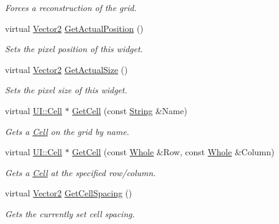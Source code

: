 \begin{DoxyCompactItemize}
\begin{DoxyCompactList}\small\item\em Forces a reconstruction of the grid. \item\end{DoxyCompactList}\item 
virtual \hyperlink{classphys_1_1Vector2}{Vector2} \hyperlink{classphys_1_1UI_1_1CellGrid_a1ead8b427b5989ec137aa0ca8e017f73}{GetActualPosition} ()
\begin{DoxyCompactList}\small\item\em Sets the pixel position of this widget. \item\end{DoxyCompactList}\item 
virtual \hyperlink{classphys_1_1Vector2}{Vector2} \hyperlink{classphys_1_1UI_1_1CellGrid_ad0ea7915446ba7821212e6a43aede7e1}{GetActualSize} ()
\begin{DoxyCompactList}\small\item\em Sets the pixel size of this widget. \item\end{DoxyCompactList}\item 
virtual \hyperlink{classphys_1_1UI_1_1Cell}{UI::Cell} $\ast$ \hyperlink{classphys_1_1UI_1_1CellGrid_a563d2fcfdb017579633727094a3176f3}{GetCell} (const \hyperlink{namespacephys_aa03900411993de7fbfec4789bc1d392e}{String} \&Name)
\begin{DoxyCompactList}\small\item\em Gets a \hyperlink{classphys_1_1UI_1_1Cell}{Cell} on the grid by name. \item\end{DoxyCompactList}\item 
virtual \hyperlink{classphys_1_1UI_1_1Cell}{UI::Cell} $\ast$ \hyperlink{classphys_1_1UI_1_1CellGrid_a6a39785b673abb8cffc8bbd0b8837208}{GetCell} (const \hyperlink{namespacephys_a460f6bc24c8dd347b05e0366ae34f34a}{Whole} \&Row, const \hyperlink{namespacephys_a460f6bc24c8dd347b05e0366ae34f34a}{Whole} \&Column)
\begin{DoxyCompactList}\small\item\em Gets a \hyperlink{classphys_1_1UI_1_1Cell}{Cell} at the specified row/column. \item\end{DoxyCompactList}\item 
virtual \hyperlink{classphys_1_1Vector2}{Vector2} \hyperlink{classphys_1_1UI_1_1CellGrid_a232260f23808cd7099f2f9a15850a14e}{GetCellSpacing} ()
\begin{DoxyCompactList}\small\item\em Gets the currently set cell spacing. \item\end{DoxyCompactList}\item 

\end{DoxyCompactItemize}

